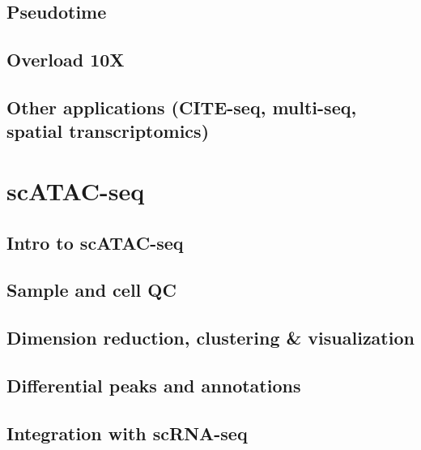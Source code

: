 \documentclass[
]{book}
\begin{document}
\hypertarget{pseudotime}{%
\section{Pseudotime}\label{pseudotime}}

\hypertarget{overload-10x}{%
\section{Overload 10X}\label{overload-10x}}

\hypertarget{other-applications-cite-seq-multi-seq-spatial-transcriptomics}{%
\section{Other applications (CITE-seq, multi-seq, spatial transcriptomics)}\label{other-applications-cite-seq-multi-seq-spatial-transcriptomics}}

\hypertarget{scatac}{%
\chapter{scATAC-seq}\label{scatac}}

\hypertarget{intro-to-scatac-seq}{%
\section{Intro to scATAC-seq}\label{intro-to-scatac-seq}}

\hypertarget{sample-and-cell-qc}{%
\section{Sample and cell QC}\label{sample-and-cell-qc}}

\hypertarget{dimension-reduction-clustering-visualization}{%
\section{Dimension reduction, clustering \& visualization}\label{dimension-reduction-clustering-visualization}}

\hypertarget{differential-peaks-and-annotations}{%
\section{Differential peaks and annotations}\label{differential-peaks-and-annotations}}

\hypertarget{integration-with-scrna-seq}{%
\section{Integration with scRNA-seq}\label{integration-with-scrna-seq}}
\end{document}
